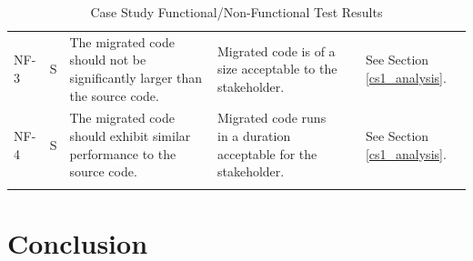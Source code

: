 \documentclass{UoYCSproject}
\renewcommand{\checkmark}{\ding{51}}
\begin{document}
\begin{landscape}
\begin{longtable}{@{}p{}p{}p{}p{}p{}p{}@{}}
  NF-3 & S & The migrated code should not be significantly larger than the source code. & Migrated code is of a size acceptable to the stakeholder. & \checkmark & See Section \ref{cs1_analysis}. \\
  NF-4 & S & The migrated code should exhibit similar performance to the source code. & Migrated code runs in a duration acceptable for the stakeholder. & \checkmark & See Section \ref{cs1_analysis}. \\
    \bottomrule
\caption{Case Study Functional/Non-Functional Test Results}
\label{table:case_study_func_test_results}
  \end{longtable}
\end{landscape}

\restoregeometry

\chapter{Conclusion}

\printbibliography
\end{document}
